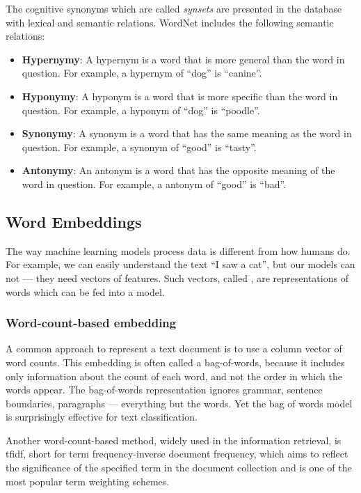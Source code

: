 The cognitive synonyms which are called \emph{synsets} are presented in the database with lexical and semantic relations. 
WordNet includes the following semantic relations:
\begin{itemize}
    \item \textbf{Hypernymy}: A hypernym is a word that is more general than the word in question. For example, a hypernym of “dog” is “canine”.
    \item \textbf{Hyponymy}: A hyponym is a word that is more specific than the word in question. For example, a hyponym of “dog” is “poodle”.
    \item \textbf{Synonymy}: A synonym is a word that has the same meaning as the word in question. For example, a synonym of “good” is “tasty”.
    \item \textbf{Antonymy}: An antonym is a word that has the opposite meaning of the word in question. For example, a antonym of “good” is “bad”.
\end{itemize}


\subsection{Word Embeddings}\label{subsec:word-embeddings}
The way machine learning models process data is different from how humans do. 
For example, we can easily understand the text “I saw a cat”, but our models can not --- they need vectors of features. 
Such vectors, called , are representations of words which can be fed into a model.


\subsubsection{Word-count-based embedding}\label{subsubsec:bag-of-words}
A common approach to represent a text document is to use a column vector of word counts.
This embedding is often called a \gls{bag-of-words}, because it includes only information about the count of each word, and not the order in which the words appear.
The bag-of-words representation ignores grammar, sentence boundaries, paragraphs — everything but the words. Yet the bag of words model is surprisingly effective for text classification.

Another word-count-based method, widely used in the information retrieval, is \acrshort{tfidf}, short for term frequency-inverse document frequency, which aims to reflect the significance of the specified term in the document collection and is one of the most popular term weighting schemes.


